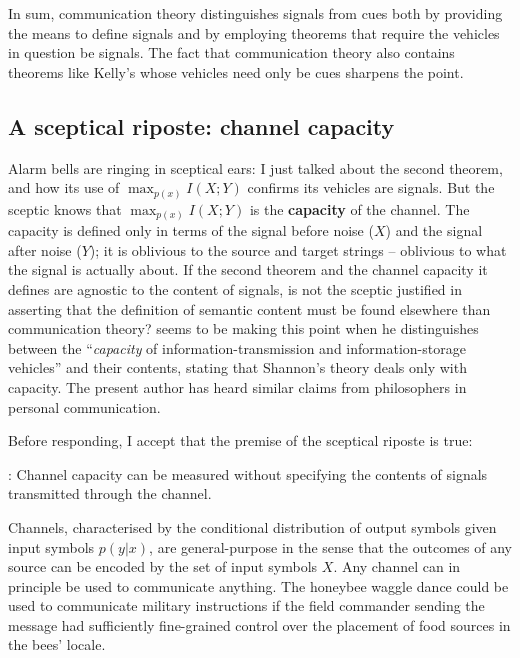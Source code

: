 In sum, communication theory distinguishes signals from cues both by providing the means to define signals and by employing theorems that require the vehicles in question be signals.
The fact that communication theory also contains theorems like Kelly's whose vehicles need only be cues sharpens the point.

\subsection{A sceptical riposte: channel capacity}

Alarm bells are ringing in sceptical ears: I just talked about the second theorem, and how its use of $\max_{p(x)}I(X;Y)$ confirms its vehicles are signals.
But the sceptic knows that $\max_{p(x)}I(X;Y)$ is the \textbf{capacity} of the channel.
The capacity is defined only in terms of the signal before noise ($X$) and the signal after noise ($Y$); it is oblivious to the source and target strings -- oblivious to what the signal is actually about.
If the second theorem and the channel capacity it defines are agnostic to the content of signals, is not the sceptic justified in asserting that the definition of semantic content must be found elsewhere than communication theory?
\citet[344]{dennett1983intentional} seems to be making this point when he distinguishes between the ``\textit{capacity} of information-transmission and information-storage vehicles'' and their contents, stating that Shannon's theory deals only with capacity.
The present author has heard similar claims from philosophers in personal communication.

Before responding, I accept that the premise of the sceptical riposte is true:

\begin{myquote}
\cia{}: Channel capacity can be measured without specifying the contents of signals transmitted through the channel.
\end{myquote}

\noindent Channels, characterised by the conditional distribution of output symbols given input symbols $p(y|x)$, are general-purpose in the sense that the outcomes of any source can be encoded by the set of input symbols $X$.
Any channel can in principle be used to communicate anything.
The honeybee waggle dance could be used to communicate military instructions if the field commander sending the message had sufficiently fine-grained control over the placement of food sources in the bees' locale.

